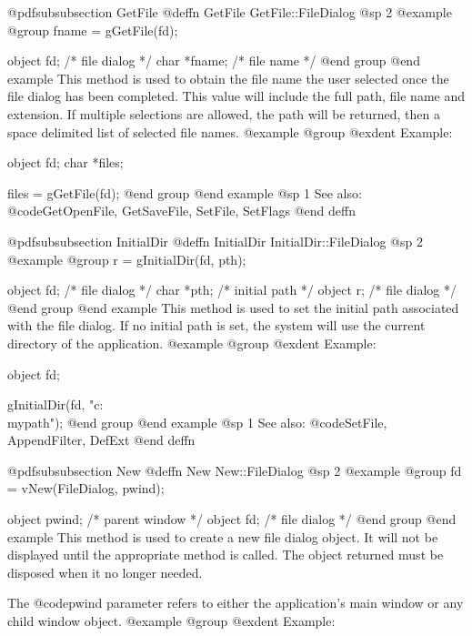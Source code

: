 @pdfsubsubsection {GetFile}
@deffn {GetFile} GetFile::FileDialog
@sp 2
@example
@group
fname = gGetFile(fd);

object  fd;     /*  file dialog  */
char    *fname; /*  file name    */
@end group
@end example
This method is used to obtain the file name the user selected once the
file dialog has been completed.  This value will include the full path,
file name and extension.  If multiple selections are allowed, the path
will be returned, then a space delimited list of selected file names.
@example
@group
@exdent Example:

object  fd;
char    *files;

files = gGetFile(fd);
@end group
@end example
@sp 1
See also:  @code{GetOpenFile, GetSaveFile, SetFile, SetFlags}
@end deffn















@pdfsubsubsection {InitialDir}
@deffn {InitialDir} InitialDir::FileDialog
@sp 2
@example
@group
r = gInitialDir(fd, pth);

object  fd;     /*  file dialog  */
char    *pth;   /*  initial path */
object  r;      /*  file dialog  */
@end group
@end example
This method is used to set the initial path associated with the file dialog.
If no initial path is set, the system will use the current directory of
the application.
@example
@group
@exdent Example:

object  fd;

gInitialDir(fd, "c:\\mypath");
@end group
@end example
@sp 1
See also:  @code{SetFile, AppendFilter, DefExt}
@end deffn







@pdfsubsubsection {New}
@deffn {New} New::FileDialog
@sp 2
@example
@group
fd = vNew(FileDialog, pwind);

object  pwind;  /*  parent window  */
object  fd;     /*  file dialog    */
@end group
@end example
This method is used to create a new file dialog object.  It will not be
displayed until the appropriate method is called.  The object returned
must be disposed when it no longer needed.

The @code{pwind} parameter refers to either the application's main window
or any child window object.
@example
@group
@exdent Example:

